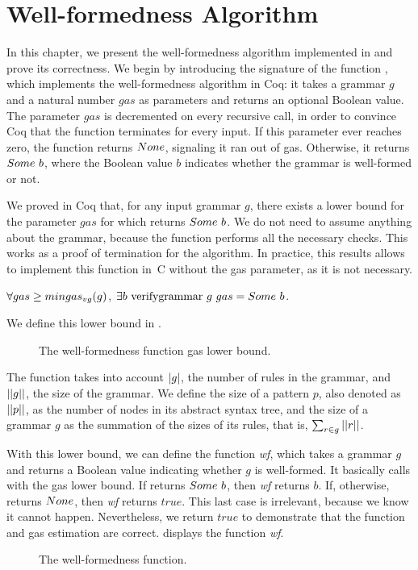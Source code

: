 \chapter{Well-formedness Algorithm}
\label{chapter:wf-algorithm}

In this chapter,
we present the well-formedness algorithm
implemented in \lpeg{}
and prove its correctness.
We begin by introducing the signature
of the function \textit{\verifygrammarname{}},
which implements the well-formedness algorithm in Coq:
it takes a grammar $g$ and a natural number $gas$ as parameters
and returns an optional Boolean value.
The parameter $gas$ is decremented on every recursive call,
in order to convince Coq that the function terminates for every input.
If this parameter ever reaches zero,
the function returns $None$,
signaling it ran out of gas.
Otherwise, it returns $Some\ b$,
where the Boolean value $b$
indicates whether the grammar
is well-formed or not.

We proved in Coq that,
for any input grammar $g$,
there exists a lower bound for the parameter $gas$
for which \textit{\verifygrammarname{}} returns $Some\ b$.
We do not need to assume anything
about the grammar, because the function
performs all the necessary checks.
This works as a proof of termination
for the algorithm.
In practice, this results allows
\lpeg{} to implement this function in~C
without the gas parameter,
as it is not necessary.
\begin{lemma}
    \label{lemma:verifygrammar-termination}
    $\forall gas \ge mingas_{vg}(g)$,
    $\exists b\ \text{verifygrammar{}}\ g\ gas = Some\ b$.
\end{lemma}

We define this lower bound
in .
\begin{figure}
    \centering
    
    \caption{The well-formedness function gas lower bound.}
    \label{fig:verifygrammargas}
\end{figure}
The function takes into account
$|g|$, the number of rules in the grammar,
and $||g||$, the size of the grammar.
We define the size of a pattern $p$, also denoted as $||p||$,
as the number of nodes in its abstract syntax tree,
and the size of a grammar $g$
as the summation of the sizes of its rules,
that is, $\sum_{r \in g} ||r||$.

With this lower bound,
we can define the function \textit{wf},
which takes a grammar $g$ and returns a Boolean value
indicating whether $g$ is well-formed.
It basically calls \textit{\verifygrammarname{}}
with the gas lower bound.
If \textit{\verifygrammarname{}} returns $Some\ b$,
then \textit{wf} returns $b$.
If, otherwise, \textit{\verifygrammarname{}} returns $None$,
then \textit{wf} returns $true$.
This last case is irrelevant, because we know it cannot happen.
Nevertheless, we return $true$
to demonstrate that the function
and gas estimation are correct.
 displays the function \textit{wf}.
\begin{figure}
    \centering
    
    \caption{The well-formedness function.}
    \label{fig:wf}
\end{figure}

